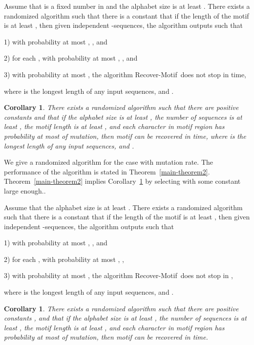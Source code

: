 \documentclass[11pt]{article}
\newtheorem{corollaryfoo}[theoremfoo]{Corollary}
\newenvironment{corollary}{\pagebreak[1]\begin{corollaryfoo}}{\end{corollaryfoo}}
\newcommand{\algmnam}{Recover-Motif}
\begin{document}
\begin{theorem}\label{main-theorem1}Assume that  is a fixed number in 
and the alphabet size  is at least . There exists a randomized
algorithm such that there is a constant  that
 if the length of the motif  is at least ,
then given  independent -sequences, the algorithm outputs  such that

1) with probability at most , , and

2) for each , with probability at most
, , and

3) with probability at most , the algorithm
\algmnam~does not stop in  time,

 where  is the longest length of any input
sequences, and .
\end{theorem}






\begin{corollary}\label{corollary1}
There exists a randomized algorithm such that there are positive
constants  and  that if the alphabet size is at least
, the number of sequences is at least , the motif
length is at least , and each character in motif region
has probability at most  of mutation,
then motif can be recovered in  time, where  is the longest length
of any input sequences, and .
\end{corollary}

We give a randomized algorithm for the case with 
mutation rate. The performance of the algorithm is stated in
Theorem~\ref{main-theorem2}. Theorem~\ref{main-theorem2} implies
Corollary~\ref{corollary2} by selecting  with some
constant  large enough..

\begin{theorem}\label{main-theorem2}Assume that the alphabet size  is at least . There
exists a randomized algorithm such that there is a constant 
that
 if the length of the motif  is at least ,
then given  independent -sequences, the
algorithm
 outputs
 such that

1) with probability at most , , and

2) for each , with probability at most
, ,

3)  with probability at most , the algorithm
\algmnam~does not stop in ,

 where  is the longest length of any input
sequences, and .
\end{theorem}


\begin{corollary}\label{corollary2}
There exists a randomized algorithm such that there are positive
constants , and  that if the alphabet size is at
least , the number of sequences is at least , the
motif length is at least , and each character in motif
region has probability at most  of mutation, then motif can
be recovered in 
time.
\end{corollary}
\end{document}
